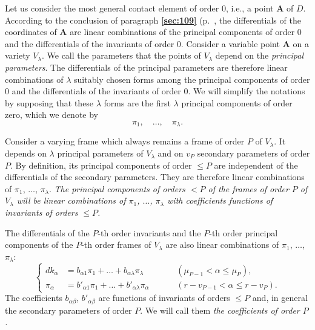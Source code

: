 \documentclass[leqno,11pt]{book}
\numberwithin{equation}{chapter}
\theoremstyle{shape1}
\theoremstyle{shapesmall}
\newcommand{\fsref}[1]{{\rm\textsection\textbf{\ref{sec:#1}}}}
\begin{document}
Let us consider the most general contact element of order $0$, i.e., a point $\mathbf{A}$ of $D$. According to the conclusion of paragraph \fsref{109} (p.~\pageref{sec:109}, the differentials of the coordinates of $\mathbf{A}$ are linear combinations of the principal components of order $0$ and the differentials of the invariants of order $0$. Consider a variable point $\mathbf{A}$ on a variety $V_{\lambda}$. We call the parameters that the points of $V_{\lambda}$ depend on the \emph{principal parameters}. The differentials of the principal parameters are therefore linear combinations of $\lambda$ suitably chosen forms among the principal components of order $0$ and the differentials of the invariants of order $0$. We will simplify the notations by supposing that these $\lambda$ forms are the first $\lambda$ principal components of order zero, which we denote by
\[
\pi_{1},\quad\dots,\quad\pi_{\lambda}.
\]

Consider a varying frame which always remains a frame of order $P$ of $V_{\lambda}$. It depends on $\lambda$ principal parameters of $V_{\lambda}$ and on $v_{P}$ secondary parameters of order $P$. By definition, its principal components of order $\le P$ are independent of the differentials of the secondary parameters. They are therefore linear combinations of $\pi_{1}$, $\dots$, $\pi_{\lambda}$. \emph{The principal components of orders $<P$ of the frames of order $P$ of $V_{\lambda}$ will be linear combinations of $\pi_{1}$, $\dots$, $\pi_{\lambda}$ with coefficients functions of invariants of orders $\le P$.}

The differentials of the $P$-th order invariants and the $P$-th order principal components of the $P$-th order frames of $V_{\lambda}$ are also linear combinations of $\pi_{1}$, $\dots$, $\pi_{\lambda}$:
\begin{equation}
  \label{eq:10.2}
  \left\{
    \begin{aligned}
      dk_{\alpha}&=b_{\alpha 1}\pi_{1}+\dots+b_{\alpha \lambda}\pi_{\lambda}&&&&(\mu_{P-1}<\alpha\le\mu_{P}),\\
      \pi_{\alpha}&=b'_{\alpha 1}\pi_{1}+\dots+b'_{\alpha\lambda}\pi_{\alpha}&&&&(r-v_{P-1}<\alpha\le r-v_{P}).
    \end{aligned}
  \right.
\end{equation}
The coefficients $b_{\alpha\beta}$, $b'_{\alpha\beta}$ are functions of invariants of orders $\le P$ and, in general the secondary parameters of order $P$. We will call them \emph{the coefficients of order $P$.}
\end{document}
